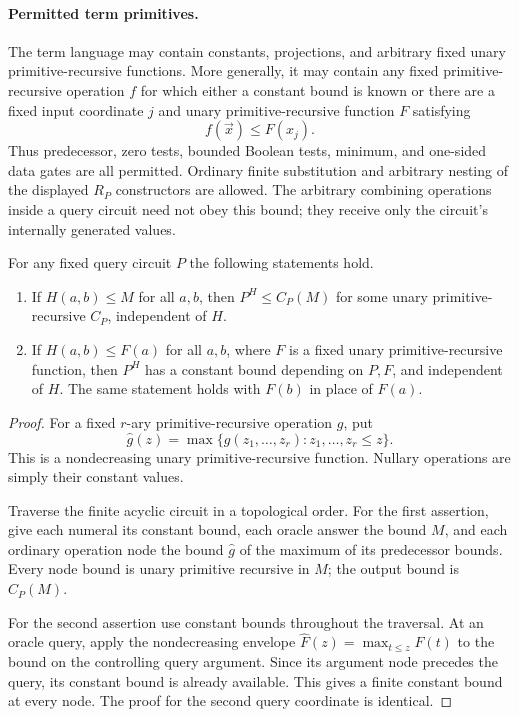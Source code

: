 \paragraph{Permitted term primitives.}
The term language may contain constants, projections, and arbitrary fixed
unary primitive-recursive functions. More generally, it may contain any
fixed primitive-recursive operation $f$ for which either a constant bound
is known or there are a fixed input coordinate $j$ and unary
primitive-recursive function $F$ satisfying
\[
                    f(\vec x)\le F(x_j).
 \tag{One-coordinate bound}
\]
Thus predecessor, zero tests, bounded Boolean tests, minimum, and
one-sided data gates are all permitted. Ordinary finite substitution
and arbitrary nesting of the displayed $R_P$ constructors are allowed.
The arbitrary combining operations inside a query circuit need not obey
this bound; they receive only the circuit's internally generated values.

\begin{lemma}
For any fixed query circuit $P$ the following statements hold.
\begin{enumerate}
\item If $H(a,b)\le M$ for all $a,b$, then
      $P^H\le C_P(M)$ for some unary primitive-recursive $C_P$,
      independent of $H$.
\item If $H(a,b)\le F(a)$ for all $a,b$, where $F$ is a fixed unary
      primitive-recursive function, then $P^H$ has a constant bound
      depending on $P,F$, and independent of $H$. The same statement
      holds with $F(b)$ in place of $F(a)$.
\end{enumerate}
\end{lemma}
\begin{proof}
For a fixed $r$-ary primitive-recursive operation $g$, put
\[
 \widehat g(z)=\max\{g(z_1,\ldots,z_r):z_1,\ldots,z_r\le z\}.
\]
This is a nondecreasing unary primitive-recursive function. Nullary
operations are simply their constant values.

Traverse the finite acyclic circuit in a topological order. For the
first assertion, give each numeral its constant bound, each oracle
answer the bound $M$, and each ordinary operation node the bound
$\widehat g$ of the maximum of its predecessor bounds. Every node bound
is unary primitive recursive in $M$; the output bound is $C_P(M)$.

For the second assertion use constant bounds throughout the traversal.
At an oracle query, apply the nondecreasing envelope
$\widehat F(z)=\max_{t\le z}F(t)$ to the bound on the controlling query
argument. Since its argument node precedes the query, its constant bound
is already available. This gives a finite constant bound at every node.
The proof for the second query coordinate is identical.
\end{proof}

